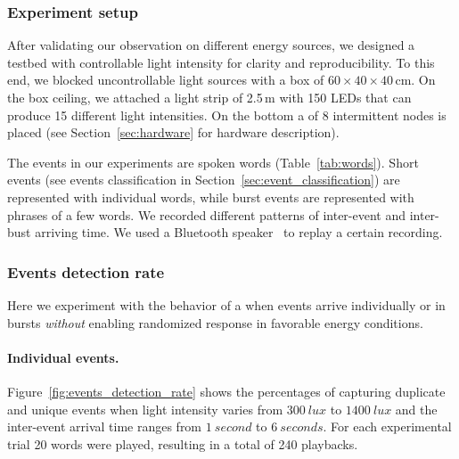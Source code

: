 \subsubsection{Experiment setup}
\label{sec:experiment_setup}
%
After validating our observation on different energy sources, we designed a testbed with controllable light intensity for clarity and reproducibility. To this end, we blocked uncontrollable light sources with a box of $60 \times 40 \times 40$\,cm. On the box ceiling, we attached a light strip of 2.5\,m with 150 LEDs that can produce 15 different light intensities. On the bottom a \fullCIM of 8 intermittent nodes is placed (see Section~\ref{sec:hardware} for hardware description).

The events in our experiments are spoken words (Table~\ref{tab:words}). 
Short events (see events classification in Section~\ref{sec:event_classification}) are represented with individual words, while burst events are represented with phrases of a few words.
We recorded different patterns of inter-event and inter-bust arriving time. We used a Bluetooth speaker~\cite{jbl} to replay a certain recording. 
%
\subsubsection{Events detection rate}

Here we experiment with the behavior of a \cis when events arrive individually or in bursts \emph{without} enabling  randomized response in favorable energy conditions. 

\paragraph{Individual events.}

Figure~\ref{fig:events_detection_rate} shows the percentages of capturing duplicate and unique events when light intensity varies from $\SI{300}{lux}$ to $\SI{1400}{lux}$ and the inter-event arrival time ranges from $\SI{1}{second}$ to $\SI{6}{seconds}$. For each experimental trial 20 words were played, resulting in a total of 240 playbacks. 

